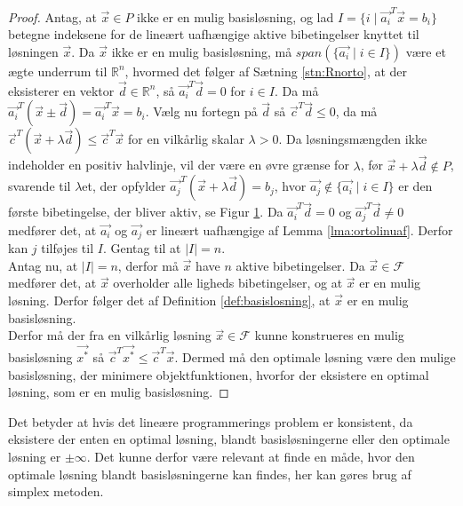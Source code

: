 \begin{proof}
Antag, at $\vec{x} \in P$ ikke er en mulig basisløsning, og lad $I =\{i \mid \vec{a_i}^T\vec{x}=b_i\}$ betegne indeksene for de lineært uafhængige aktive bibetingelser knyttet til løsningen $\vec{x}$.
Da $\vec{x}$ ikke er en mulig basisløsning, må $span(\{\vec{a_i}\mid i\in I\})$ være et ægte underrum til $\mathds{R}^n$, hvormed det følger af Sætning \ref{stn:Rnorto}, at der eksisterer en vektor $\vec{d} \in \mathds{R}^n$, så $\vec{a_i}^T\vec{d}=0$ for $i \in I$.
Da må $\vec{a_i}^T(\vec{x}\pm \vec{d})= \vec{a_i}^T\vec{x}=b_i$.
Vælg nu fortegn på $\vec{d}$ så $\vec{c}^T\vec{d}\leq 0$, da må $\vec{c}^T(\vec{x}+\lambda\vec{d}) \leq \vec{c}^T\vec{x}$ for en vilkårlig skalar $\lambda > 0$.
Da løsningsmængden ikke indeholder en positiv halvlinje, vil der være en øvre grænse for $\lambda$, før $\vec{x}+\lambda\vec{d} \notin P$, svarende til $\lambda$et, der opfylder $\vec{a_j}^T(\vec{x}+\lambda\vec{d})=b_j$, hvor $\vec{a_j} \notin \{\vec{a_i}\mid i\in I\}$ er den første bibetingelse, der bliver aktiv, se Figur \ref{fig:eksistens}.
Da $\vec{a_i}^T\vec{d}=0$ og $\vec{a_j}^T\vec{d} \neq 0$ medfører det, at $\vec{a_i}$ og $\vec{a_j}$  er lineært uafhængige af Lemma \ref{lma:ortolinuaf}. 
Derfor kan $j$ tilføjes til $I$.
Gentag til at $|I|=n$.
\\ Antag nu, at $|I|=n$, derfor må $\vec{x}$ have $n$ aktive bibetingelser.
Da $\vec{x}\in \mathcal{F}$ medfører det, at $\vec{x}$ overholder alle ligheds bibetingelser, og at $\vec{x}$ er en mulig løsning. 
Derfor følger det af Definition \ref{def:basislosning}, at $\vec{x}$ er en mulig basisløsning.
\\Derfor må der fra en vilkårlig løsning $\vec{x}\in \mathcal{F}$ kunne konstrueres en mulig basisløsning $\vec{x^*}$ så $\vec{c}^T\vec{x^*} \leq \vec{c}^T \vec{x}$.
Dermed må den optimale løsning være den mulige basisløsning, der minimere objektfunktionen, hvorfor der eksistere en optimal løsning, som er en mulig basisløsning.
\end{proof}
\begin{figure}
\begin{center}
	
	\label{fig:eksistens}
\end{center}
\end{figure}
Det betyder at hvis det lineære programmerings problem er konsistent, da eksistere der enten en optimal løsning, blandt basisløsningerne eller den optimale løsning er $\pm \infty$.
Det kunne derfor være relevant at finde en måde, hvor den optimale løsning blandt basisløsningerne kan findes, her kan gøres brug af simplex metoden.



